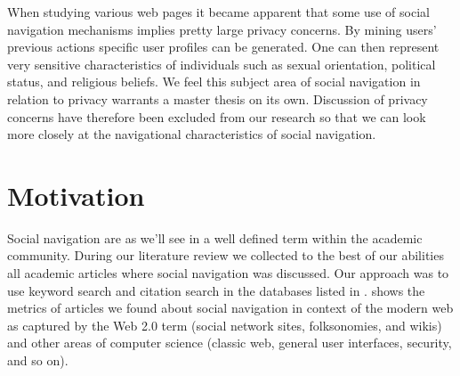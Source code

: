 When studying various web pages it became apparent that some use of
social navigation mechanisms implies pretty large privacy concerns. By mining
users' previous actions specific user profiles can be generated. One can then
represent very sensitive characteristics of individuals such as sexual
orientation, political status, and religious beliefs.
We feel this subject area of social navigation in relation to privacy warrants
a master thesis on its own. Discussion of privacy concerns have therefore
been excluded from our research so that we can look more closely at the
navigational characteristics of social navigation.

\section{Motivation}


Social navigation are as we'll see in
a well defined term within the academic community.
During our literature review we collected to the best of our abilities all
academic articles where social navigation was discussed. Our approach was to
use keyword search and citation search in the databases listed in
.%
 shows the metrics of articles
we found about social navigation in context of the modern web as captured by
the Web 2.0 term (social network sites, folksonomies, and wikis) and other
areas of computer science (classic web, general user interfaces, security, and
so on).

